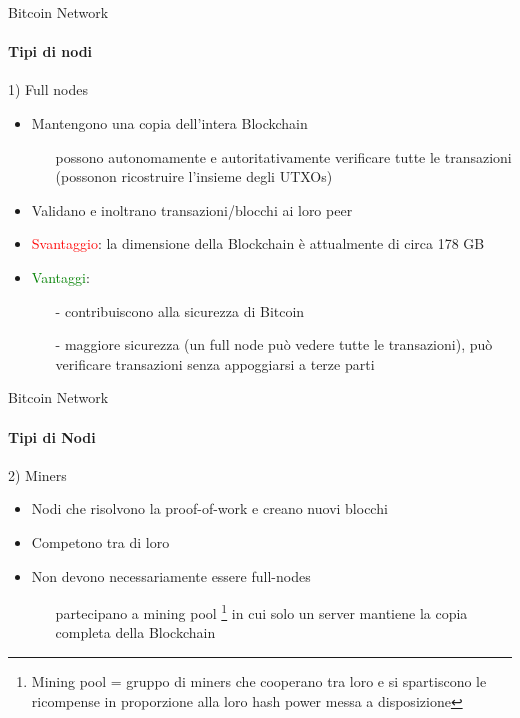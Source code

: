 \documentclass{beamer}
\begin{document}
  
  
  
  \begin{frame}{Bitcoin Network}
    \framesubtitle{Tipi di nodi}
    \begin{block}{1) Full nodes}
        \begin{itemize}
            \item Mantengono una copia dell'intera Blockchain
            \begin{itemize}
                \item[\MVRightarrow] possono autonomamente e autoritativamente verificare tutte le transazioni (possonon ricostruire l'insieme degli UTXOs)
            \end{itemize}
            \item Validano e inoltrano transazioni/blocchi ai loro peer
            \item \textcolor{red}{Svantaggio}: la dimensione della Blockchain è attualmente di circa 178 GB \cite{statista}
            \item \textcolor{green}{Vantaggi}: 
            \begin{itemize}
                \item[-] contribuiscono alla sicurezza di Bitcoin
                \item[-] maggiore sicurezza (un full node può vedere tutte le transazioni), può verificare transazioni senza appoggiarsi a terze parti
            \end{itemize}
        \end{itemize}
    \end{block}
  \end{frame}
  
  
  
  
   \begin{frame}{Bitcoin Network}
    \framesubtitle{Tipi di Nodi}
    \begin{block}{2) Miners}
        \begin{itemize}
            \item Nodi che risolvono la proof-of-work e creano nuovi blocchi
            \item Competono tra di loro 
            \item Non devono necessariamente essere full-nodes
            \begin{itemize}
                \item[\MVRightarrow] partecipano a mining pool \footnote{Mining pool = gruppo di miners che cooperano tra loro e si spartiscono le ricompense in proporzione alla loro hash power messa a disposizione} in cui solo un server mantiene la copia completa della Blockchain
            \end{itemize}
        \end{itemize}
    \end{block}
  \end{frame}
  
\end{document}
